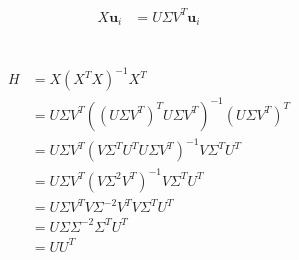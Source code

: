 \documentclass[12pt,a4paper]{article}
\begin{document}
\subsection{}

\begin{align*}
X \textbf{u}_i   &= U\Sigma V^T \textbf{u}_i\\
\end{align*}

\subsection{}
\subsection{}
\subsection{}

\begin{align*}
H &= X(X^TX)^{-1}X^T\\
&= U\Sigma V^T ((U\Sigma V^T)^TU\Sigma V^T)^{-1}(U\Sigma V^T)^T\\
&= U\Sigma V^T (V\Sigma^TU^TU\Sigma V^T)^{-1}V\Sigma^TU^T\\
&= U\Sigma V^T (V\Sigma^2 V^T)^{-1}V\Sigma^TU^T\\
&= U\Sigma V^T V\Sigma^{-2} V^TV\Sigma^TU^T\\
&= U\Sigma \Sigma^{-2}\Sigma^TU^T\\
&= UU^T\\
\end{align*}
\end{document}
